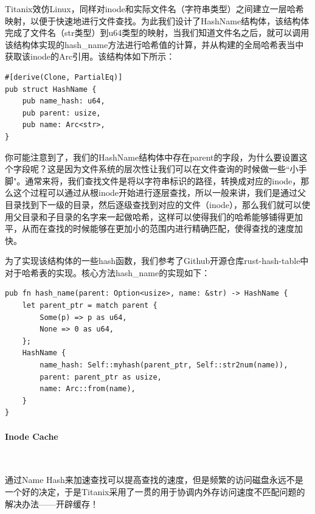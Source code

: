 Titanix效仿Linux，同样对inode和实际文件名（字符串类型）之间建立一层哈希映射，以便于快速地进行文件查找。为此我们设计了HashName结构体，该结构体完成了文件名（str类型）到u64类型的映射，当我们知道文件名之后，就可以调用该结构体实现的hash\_name方法进行哈希值的计算，并从构建的全局哈希表当中获取该inode的Arc引用。该结构体如下所示：

\begin{tcolorbox}[
title=\textbf{os/src/fs/hash\_name.rs},
listing only,
breakable
]
\begin{verbatim}
#[derive(Clone, PartialEq)]
pub struct HashName {
    pub name_hash: u64,
    pub parent: usize,
    pub name: Arc<str>,
}
\end{verbatim}
\end{tcolorbox}

你可能注意到了，我们的HashName结构体中存在parent的字段，为什么要设置这个字段呢？这是因为文件系统的层次性让我们可以在文件查询的时候做一些``小手脚"。通常来将，我们查找文件是将以字符串标识的路径，转换成对应的inode，那么这个过程可以通过从根inode开始进行逐层查找，所以一般来讲，我们是通过父目录找到下一级的目录，然后逐级查找到对应的文件（inode），那么我们就可以使用父目录和子目录的名字来一起做哈希，这样可以使得我们的哈希能够铺得更加平，从而在查找的时候能够在更加小的范围内进行精确匹配，使得查找的速度加快。

为了实现该结构体的一些hash函数，我们参考了Github开源仓库rust-hash-table中对于哈希表的实现。核心方法hash\_name的实现如下：
\begin{tcolorbox}[
title=\textbf{os/src/fs/hash\_name.rs},
listing only,
breakable
]
\begin{verbatim}
pub fn hash_name(parent: Option<usize>, name: &str) -> HashName {
    let parent_ptr = match parent {
        Some(p) => p as u64,
        None => 0 as u64,
    };
    HashName {
        name_hash: Self::myhash(parent_ptr, Self::str2num(name)),
        parent: parent_ptr as usize,
        name: Arc::from(name),
    }
}
\end{verbatim}
\end{tcolorbox}

\paragraph{Inode Cache}~{}

通过Name Hash来加速查找可以提高查找的速度，但是频繁的访问磁盘永远不是一个好的决定，于是Titanix采用了一贯的用于协调内外存访问速度不匹配问题的解决办法——开辟缓存！

